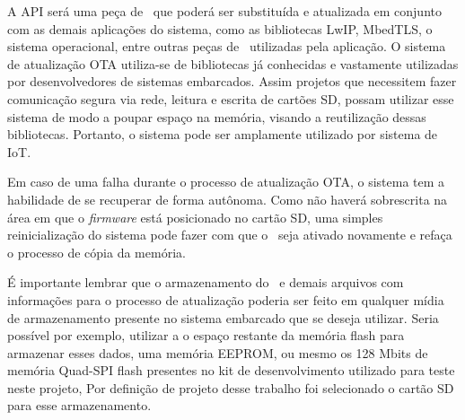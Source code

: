 A API será uma peça de \software\ que poderá ser substituída e atualizada em conjunto com as demais aplicações do sistema, como as bibliotecas LwIP, MbedTLS, o sistema operacional, entre outras peças de \software\ utilizadas pela aplicação. 
O sistema de atualização OTA utiliza-se de bibliotecas já conhecidas e vastamente utilizadas por desenvolvedores de sistemas embarcados. Assim projetos que necessitem fazer comunicação segura via rede, leitura e escrita de cartões SD, possam utilizar esse sistema de modo a poupar espaço na memória, visando a reutilização dessas bibliotecas. Portanto, o sistema pode ser amplamente utilizado por sistema de IoT. 

Em caso de uma falha durante o processo de atualização OTA, o sistema tem a habilidade de se recuperar de forma autônoma. Como não haverá sobrescrita na área em que o \textit{firmware} está posicionado no cartão SD, uma simples reinicialização do sistema pode fazer com que o \bootloader\ seja ativado novamente e refaça o processo de cópia da memória.

É importante lembrar que o armazenamento do \firmware\ e demais arquivos com informações para o processo de atualização poderia ser feito em qualquer mídia de armazenamento presente no sistema embarcado que se deseja utilizar. Seria possível por exemplo, utilizar a o espaço restante da memória flash para armazenar esses dados, uma memória EEPROM, ou mesmo os 128 Mbits de memória Quad-SPI flash presentes no kit de desenvolvimento utilizado para teste neste projeto, Por definição de projeto desse trabalho foi selecionado o cartão SD para esse armazenamento.



